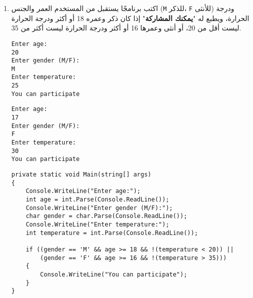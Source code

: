 \documentclass[12pt]{article}
\begin{document}
\begin{enumerate}[itemsep=3em]
\begin{enumerate}[itemsep=3em]
\begin{enumerate}[itemsep=3em]
\begin{enumerate}[itemsep=3em]
\begin{enumerate}[itemsep=3em]
\begin{enumerate}[itemsep=3em]
\begin{enumerate}[itemsep=3em]
\begin{enumerate}
\item
اكتب برنامجًا يستقبل من المستخدم العمر والجنس (\texttt{M} للذكر، \texttt{F} للأنثى) ودرجة الحرارة، ويطبع له "\textbf{يمكنك المشاركة}" إذا كان ذكر وعمره 18 أو أكثر ودرجة الحرارة ليست أقل من 20، أو أنثى وعمرها 16 أو أكثر ودرجة الحرارة ليست أكثر من 35.
\ifdetailed
\begin{example}[1]
\begin{english}
\begin{lstlisting}
Enter age:
20
Enter gender (M/F):
M
Enter temperature:
25
You can participate
\end{lstlisting}
\end{english}
\end{example}
\begin{example}[2]
\begin{english}
\begin{lstlisting}
Enter age:
17
Enter gender (M/F):
F
Enter temperature:
30
You can participate
\end{lstlisting}
\end{english}
\end{example}

\ifwithsols
\begin{solution}
\begin{english}
\begin{lstlisting}
private static void Main(string[] args)
{
    Console.WriteLine("Enter age:");
    int age = int.Parse(Console.ReadLine());
    Console.WriteLine("Enter gender (M/F):");
    char gender = char.Parse(Console.ReadLine());
    Console.WriteLine("Enter temperature:");
    int temperature = int.Parse(Console.ReadLine());

    if ((gender == 'M' && age >= 18 && !(temperature < 20)) ||
        (gender == 'F' && age >= 16 && !(temperature > 35)))
    {
        Console.WriteLine("You can participate");
    }
}
\end{lstlisting}
\end{english}
\end{solution}
\clearpage
\fi
\fi


\end{enumerate}
\end{enumerate}
\end{enumerate}
\end{enumerate}
\end{enumerate}
\end{enumerate}
\end{enumerate}
\end{enumerate}
\end{document}
